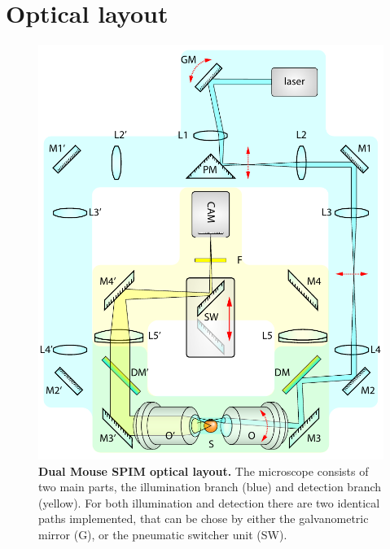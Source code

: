 \documentclass{diploma_style}
\begin{document}
    


\section{Optical layout}

\begin{figure}[hbt]
    \centering
    \includegraphics[page=1,width=1\textwidth]{figures/2_DualMouse/fullSchematics}
    \caption{\textbf{Dual Mouse SPIM optical layout.} The microscope consists of two main parts, the illumination branch (blue) and detection branch (yellow). For both illumination and detection there are two identical paths implemented, that can be chose by either the galvanometric mirror (G), or the pneumatic switcher unit (SW). 
}
    \label{fig:fullSchematics}
\end{figure}
\end{document}

